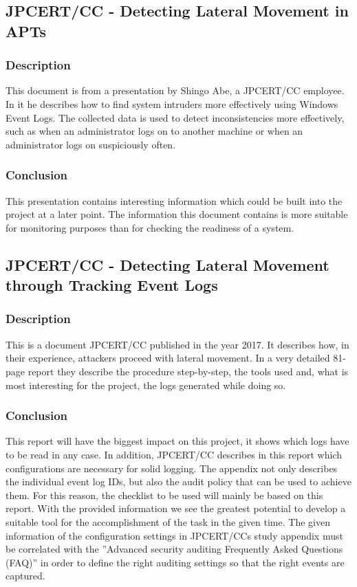 \subsection{JPCERT/CC - Detecting Lateral Movement in APTs} \label{DetectingLateral}
\subsubsection{Description}
This document \cite{Abe2016} is from a presentation by Shingo Abe, a JPCERT/CC employee. In it he describes how to find system intruders more effectively using Windows Event Logs. The collected data is used to detect inconsistencies more effectively, such as when an administrator logs on to another machine or when an administrator logs on suspiciously often. 
\subsubsection{Conclusion}
This presentation contains interesting information which could be built into the project at a later point. The information this document contains is more suitable for monitoring purposes than for checking the readiness of a system.

\subsection{JPCERT/CC - Detecting Lateral Movement through Tracking Event Logs}\label{JPCertStudy}
\subsubsection{Description}
This is a document \cite{JPCERTDetectingLateralMovement} JPCERT/CC published in the year 2017. It describes how, in their experience, attackers proceed with lateral movement. In a very detailed 81-page report they describe the procedure step-by-step, the tools used and, what is most interesting for the project, the logs generated while doing so.
\subsubsection{Conclusion}
This report will have the biggest impact on this project, it shows which logs have to be read in any case. In addition, JPCERT/CC describes in this report which configurations are necessary for solid logging. The appendix not only describes the individual event log IDs, but also the audit policy that can be used to achieve them. For this reason, the checklist to be used will mainly be based on this report. With the provided information we see the greatest potential to develop a suitable tool for the accomplishment of the task in the given time. The given information of the configuration settings in JPCERT/CCs study appendix must be correlated with the ''Advanced security auditing Frequently Asked Questions (FAQ)'' \cite{AdvancedSecurityAuditing} in order to define the right auditing settings so that the right events are captured.


